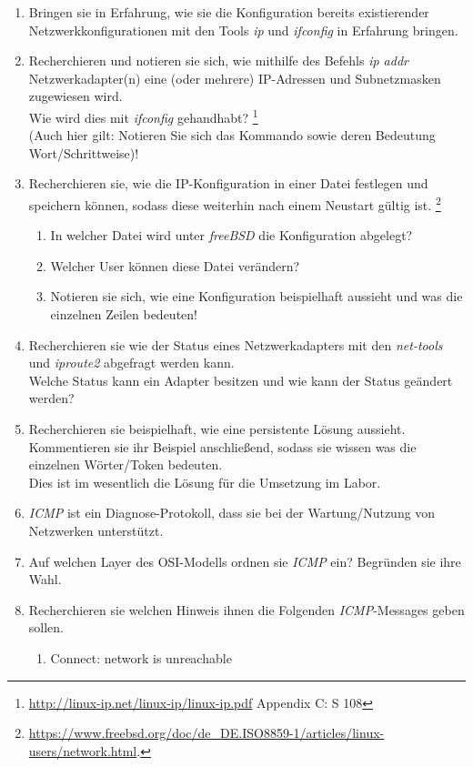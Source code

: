 \documentclass[paper=a4,fontsize=11pt]{scrartcl}%
\numberwithin{equation}{section}
\begin{document}
\begin{enumerate}
 	\item Bringen sie in Erfahrung, wie sie die Konfiguration bereits existierender Netzwerkkonfigurationen mit den Tools \emph{ip} und \emph{ifconfig} in Erfahrung bringen.
	\item Recherchieren und notieren sie sich, wie mithilfe des Befehls \emph{ip addr} Netzwerkadapter(n) eine (oder mehrere) IP-Adressen und Subnetzmasken zugewiesen wird.\\
	Wie wird dies mit \emph{ifconfig} gehandhabt? \footnote{\url{http://linux-ip.net/linux-ip/linux-ip.pdf} Appendix C: S 108}\\
	(Auch hier gilt: Notieren Sie sich das Kommando sowie deren Bedeutung Wort/Schrittweise)!
	\item Recherchieren sie, wie die IP-Konfiguration in einer Datei festlegen und speichern können, sodass diese weiterhin nach einem Neustart gültig ist.  \footnote{\url{https://www.freebsd.org/doc/de_DE.ISO8859-1/articles/linux-users/network.html}.}
	\begin{enumerate}
		\item In welcher Datei wird unter \emph{freeBSD} die Konfiguration abgelegt?
		\item Welcher User können diese Datei verändern?
		\item Notieren sie sich, wie eine Konfiguration beispielhaft aussieht und was die einzelnen Zeilen bedeuten!
	\end{enumerate}
	\item Recherchieren sie wie der Status eines Netzwerkadapters mit den \emph{net-tools} und \emph{iproute2} abgefragt werden kann.\\
	Welche Status kann ein Adapter besitzen und wie kann der Status geändert werden?
	\item Recherchieren sie beispielhaft, wie eine persistente Lösung aussieht. Kommentieren sie ihr Beispiel anschließend, sodass sie wissen was die einzelnen Wörter/Token bedeuten.\\
	Dies ist im wesentlich die Lösung für die Umsetzung im Labor.
	\item \emph{ICMP} ist ein Diagnose-Protokoll, dass sie bei der Wartung/Nutzung von Netzwerken unterstützt.
	\item Auf welchen Layer des OSI-Modells ordnen sie \emph{ICMP} ein? Begründen sie ihre Wahl.
	\item Recherchieren sie welchen Hinweis ihnen die Folgenden \emph{ICMP}-Messages geben sollen.
	\begin{enumerate}
		\item Connect: network is unreachable

\end{enumerate}
\end{enumerate}
\end{document}
